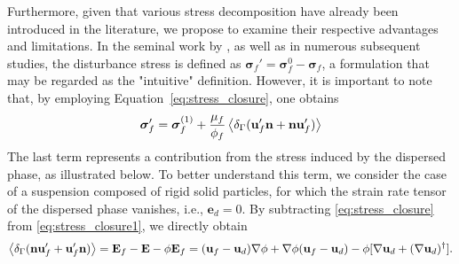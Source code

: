Furthermore, given that various stress decomposition have already been introduced in the literature, we propose to examine their respective advantages and limitations. 
In the seminal work by \citet{zhang1997momentum}, as well as in numerous subsequent studies, the disturbance stress is defined as $\bm\sigma_f' = \bm\sigma_f^0 - \bm\sigma_f$, a formulation that may be regarded as the "intuitive" definition. 
However, it is important to note that, by employing Equation~\ref{eq:stress_closure}, one obtains
\begin{equation}
    \bm\sigma_f'
    = \bm \sigma _f ^{(1)}
    + \frac{\mu_f}{\phi_f} \avg{\delta_\Gamma( \textbf{u}_f'  \textbf{n} +  \textbf{n} \textbf{u}_f' )}
    \label{eq:stress_closure_zhang}
\end{equation}
The last term represents a contribution from the stress induced by the dispersed phase, as illustrated below. 
To better understand this term, we consider the case of a suspension composed of rigid solid particles, for which the strain rate tensor of the dispersed phase vanishes, i.e., $\textbf{e}_d = 0$.
By subtracting \ref{eq:stress_closure} from \ref{eq:stress_closure1}, we directly obtain
\begin{equation}
    \left<\delta_\Gamma (\textbf{n} \textbf{u}_f'+  \textbf{u}_f' \textbf{n})\right>
    = \textbf{E}_f - \textbf{E}
    - \phi \textbf{E}_f 
    =
    (\textbf{u}_f - \textbf{u}_d)\mathbf{\nabla} \phi + \mathbf{\nabla} \phi (\textbf{u}_f - \textbf{u}_d)   
    -  \phi [\mathbf{\nabla} \textbf{u}_d+ (\mathbf{\nabla} \textbf{u}_d)^\dagger ]. 
\end{equation} 
